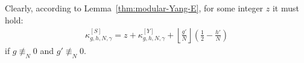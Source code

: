 \documentclass{article}
\begin{document}
\begin{Hemmecke}
Clearly, according to Lemma~\ref{thm:modular-Yang-E}, for some integer
$z$ it must hold:
\begin{gather*}
  \kappa_{g,h,N,\gamma}^{[S]}
  =
  z + \kappa_{g,h,N,\gamma}^{[Y]}
    + \left\lfloor\frac{g'}{N} \right\rfloor
      \left(\frac{1}{2} - \frac{h'}{N}\right)
\end{gather*}
if $g\not\equiv_N 0$ and $g'\not\equiv_N 0$.





\end{Hemmecke}
\end{document}

